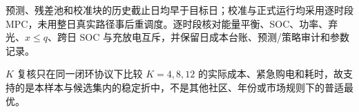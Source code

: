 预测、残差池和校准块的历史截止日均早于目标日；校准与正式运行均采用逐时段 MPC，未用整日真实路径事后重调度。逐时段核对能量平衡、SOC、功率、弃光、$x\le q$、跨日 SOC 与充放电互斥，并保留日成本台账、预测/策略审计和参数记录。

$K$ 复核只在同一闭环协议下比较 $K=4,8,12$ 的实际成本、紧急购电和耗时，故支持的是本样本与候选集内的稳定折中，不是其他社区、年份或市场规则下的普适最优。

